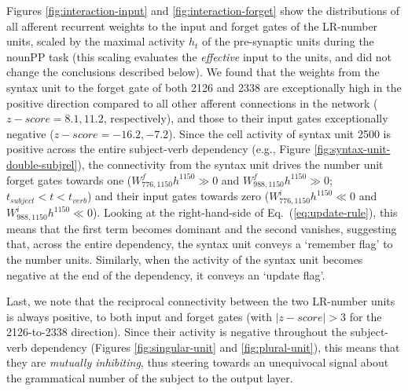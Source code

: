 Figures \ref{fig:interaction-input} and \ref{fig:interaction-forget}
show the distributions of all afferent recurrent weights to the input
and forget gates of the LR-number units, scaled by the maximal activity
$h_t$ of the pre-synaptic units during the nounPP task (this scaling evaluates
the \textit{effective} input to the units, and did not change the conclusions described below). We found that the weights from the
syntax unit to the forget gate of both \unit{2}{126} and \unit{2}{338}
are exceptionally high in the positive direction compared to all other
afferent connections in the network ($z-score=8.1, 11.2$, respectively), and
those to their input gates exceptionally negative ($z-score=-16.2,
-7.2$). Since the cell activity of syntax unit \unit{2}{500} is
positive across the entire subject-verb dependency (e.g., Figure
\ref{fig:syntax-unit-double-subjrel}), the connectivity from the
syntax unit drives the number unit forget gates towards one
($W^f_{776, 1150}h^{1150}\gg0$ and $W^f_{988, 1150}h^{1150}\gg0$; $t_{subject}<t<t_{verb}$) and their input gates towards zero
($W^i_{776, 1150}h^{1150}\ll0$ and $W^i_{988, 1150}h^{1150}\ll0$). Looking at the right-hand-side of
Eq.~(\ref{eq:update-rule}), this means that the first term becomes
dominant and the second vanishes, suggesting that, across the entire
dependency, the syntax unit conveys a `remember flag' to the number
units. Similarly, when the activity of the syntax unit becomes
negative at the end of the dependency, it conveys an `update flag'.

Last, we note that the reciprocal connectivity between the two
LR-number units is always positive, to both input and forget
gates (with $|z-score|>3$ for the \unit{2}{126}-to-\unit{2}{338} direction). Since
their activity is negative throughout the subject-verb dependency
(Figures \ref{fig:singular-unit} and \ref{fig:plural-unit}), this means
that they are \textit{mutually inhibiting}, thus steering towards an
unequivocal signal about the grammatical number of the subject to the
output layer.

